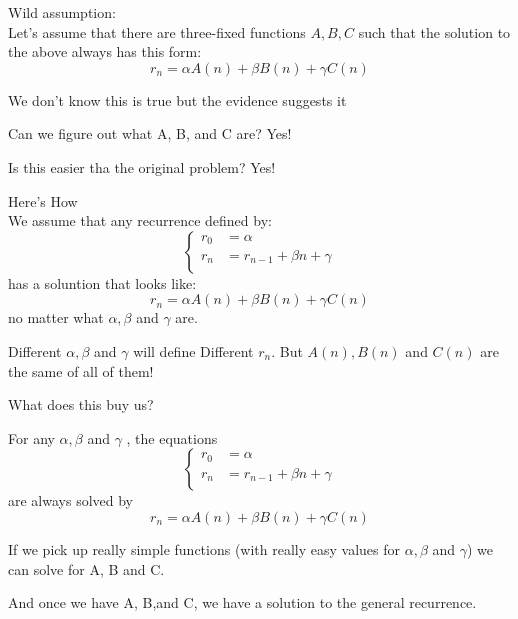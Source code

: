 \documentclass[mode=geye]{elegantnote}
\begin{document}
Wild assumption: \\
Let's assume that there are three-fixed
functions $ A, B, C $  such that the solution to 
the above always has this form:
\begin{equation*}
    r_n = \alpha A(n) + \beta B(n) + \gamma C(n)
\end{equation*}

We don't know this is true but the evidence suggests it

Can we figure out what A, B, and C are? Yes!

Is this easier tha the original problem? Yes!

Here's How\\
We assume that any recurrence defined by:
\begin{equation*}
    \left\{
        \begin{array}{ll}
            r_0 &= \alpha\\
            r_n &= r_{n-1}+\beta n+\gamma\\
        \end{array}
    \right.
\end{equation*}
has a soluntion that looks like:
\begin{equation*}
    r_n = \alpha A(n) + \beta B(n) + \gamma C(n)
\end{equation*}
no matter what $ \alpha, \beta $ and $ \gamma $ are.

Different $ \alpha, \beta $ and $ \gamma $ will define Different $ r_n $. But $ A(n), B(n) $ and $ C(n) $ are the same of all of them!

What does this buy us?

For any $ \alpha, \beta $ and $ \gamma $ , the equations
\begin{equation*}
    \left\{
        \begin{array}{ll}
            r_0 &= \alpha\\
            r_n &= r_{n-1}+\beta n+\gamma\\
        \end{array}
    \right.
\end{equation*}
are always solved by
\begin{equation*}
    r_n = \alpha A(n) + \beta B(n) + \gamma C(n)
\end{equation*}

If we pick up really simple functions (with really easy values for  $ \alpha, \beta $ and $ \gamma $) we can solve for A, B and C.

And once we have A, B,and C, we have a solution to the general recurrence.
\end{document}
